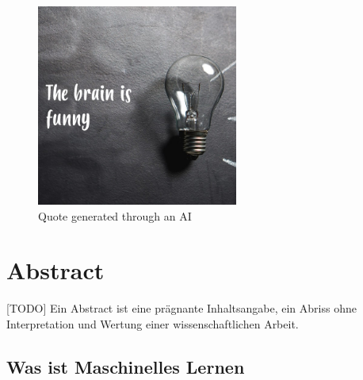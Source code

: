 \documentclass{thesisclass}
\begin{document}



\frontmatter
{}

\blankpage

\blankpage

\begin{figure}[h]
  \center
  \includegraphics[width=250px]{images/inspirobotQuote.jpg}
  \caption{Quote generated through an AI \cite{inspirobot}}
  \label{fig:Inspirational quote by AI}
\end{figure}

\tableofcontents
\cleardoublepage

%




\chapter{Abstract}
[TODO] Ein Abstract ist eine prägnante Inhaltsangabe, ein Abriss ohne Interpretation und Wertung einer wissenschaftlichen Arbeit.
\newpage

\section{Was ist Maschinelles Lernen}
\end{document}
